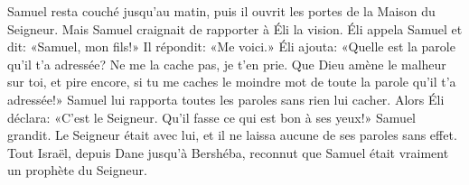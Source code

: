 Samuel resta couché jusqu’au matin, puis il ouvrit les portes de la Maison du Seigneur.
	Mais Samuel craignait de rapporter à Éli la vision.
Éli appela Samuel et dit: «Samuel, mon fils!»
	Il répondit: «Me voici.»
Éli ajouta:
	«Quelle est la parole qu’il t’a adressée?
	Ne me la cache pas, je t’en prie.
Que Dieu amène le malheur sur toi, et pire encore,
	si tu me caches le moindre mot de toute la parole qu’il t’a adressée!»
Samuel lui rapporta toutes les paroles sans rien lui cacher.
Alors Éli déclara: «C’est le Seigneur. Qu’il fasse ce qui est bon à ses yeux!»
Samuel grandit.
Le Seigneur était avec lui, et il ne laissa aucune de ses paroles sans effet.
	Tout Israël, depuis Dane jusqu’à Bershéba,
	reconnut que Samuel était vraiment un prophète du Seigneur.
